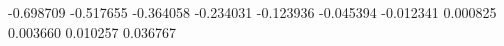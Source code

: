 -0.698709
-0.517655
-0.364058
-0.234031
-0.123936
-0.045394
-0.012341
0.000825
0.003660
0.010257
0.036767
